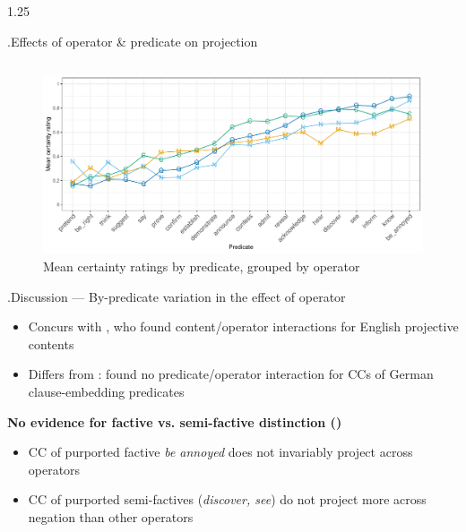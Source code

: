 \documentclass[final, table]{beamer}
\newlength{\colwidth}
\newlength{\vboxsep}
\newlength{\mboxpreadjust}
\begin{document}
\begin{frame}[t]
\begin{columns}[t]
\begin{column}{1.25\colwidth}
\begin{normalbox}{\phantom.\hfill Effects of operator \& predicate on projection}
\begin{tabular}{p{.70\linewidth} p{.3\linewidth}}
				\end{tabular}
				\vspace{-1.6\baselineskip}
				\begin{figure}[h]
					\centering
					\includegraphics[width=\linewidth]{projective-pred-op.pdf}
					\vspace{-2.2\baselineskip}
					\caption{Mean certainty ratings by predicate, grouped by operator}
					\label{fig:figure3}
				\end{figure}
				\vspace{-.8\baselineskip}
			\end{normalbox}
			
			\vspace{\vboxsep}
			\begin{normalbox}{\phantom.\hfill Discussion --- By-predicate variation in the effect of operator}
				\begin{itemize}
					\item Concurs with \citet{smith_relationship_2014}, who found content/operator interactions for English projective contents
					\item Differs from \citet{sieker_projective_2022}: found no predicate/operator interaction for CCs of German clause-embedding predicates
				\end{itemize}
				
				\textbf{No evidence for factive vs. semi-factive distinction (\citealt{karttunen_observations_1971})}
				\vspace{\mboxpreadjust}
				\begin{itemize}
					\item CC of purported factive \textit{be annoyed} does not invariably project across operators
					\item CC of purported semi-factives (\textit{discover, see}) do not project more across negation than other operators
				\end{itemize}


\end{normalbox}
\end{column}
\end{columns}
\end{frame}
\end{document}
